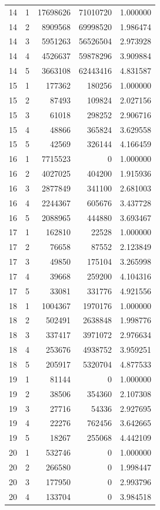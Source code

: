 \begin{longtable}{rrrrr}
14 & 1 & 17698626 & 71010720 & 1.000000 \\
14 & 2 & 8909568 & 69998520 & 1.986474 \\
14 & 3 & 5951263 & 56526504 & 2.973928 \\
14 & 4 & 4526637 & 59878296 & 3.909884 \\
14 & 5 & 3663108 & 62443416 & 4.831587 \\
15 & 1 & 177362 & 180256 & 1.000000 \\
15 & 2 & 87493 & 109824 & 2.027156 \\
15 & 3 & 61018 & 298252 & 2.906716 \\
15 & 4 & 48866 & 365824 & 3.629558 \\
15 & 5 & 42569 & 326144 & 4.166459 \\
16 & 1 & 7715523 & 0 & 1.000000 \\
16 & 2 & 4027025 & 404200 & 1.915936 \\
16 & 3 & 2877849 & 341100 & 2.681003 \\
16 & 4 & 2244367 & 605676 & 3.437728 \\
16 & 5 & 2088965 & 444880 & 3.693467 \\
17 & 1 & 162810 & 22528 & 1.000000 \\
17 & 2 & 76658 & 87552 & 2.123849 \\
17 & 3 & 49850 & 175104 & 3.265998 \\
17 & 4 & 39668 & 259200 & 4.104316 \\
17 & 5 & 33081 & 331776 & 4.921556 \\
18 & 1 & 1004367 & 1970176 & 1.000000 \\
18 & 2 & 502491 & 2638848 & 1.998776 \\
18 & 3 & 337417 & 3971072 & 2.976634 \\
18 & 4 & 253676 & 4938752 & 3.959251 \\
18 & 5 & 205917 & 5320704 & 4.877533 \\
19 & 1 & 81144 & 0 & 1.000000 \\
19 & 2 & 38506 & 354360 & 2.107308 \\
19 & 3 & 27716 & 54336 & 2.927695 \\
19 & 4 & 22276 & 762456 & 3.642665 \\
19 & 5 & 18267 & 255068 & 4.442109 \\
20 & 1 & 532746 & 0 & 1.000000 \\
20 & 2 & 266580 & 0 & 1.998447 \\
20 & 3 & 177950 & 0 & 2.993796 \\
20 & 4 & 133704 & 0 & 3.984518 \\

\end{longtable}
